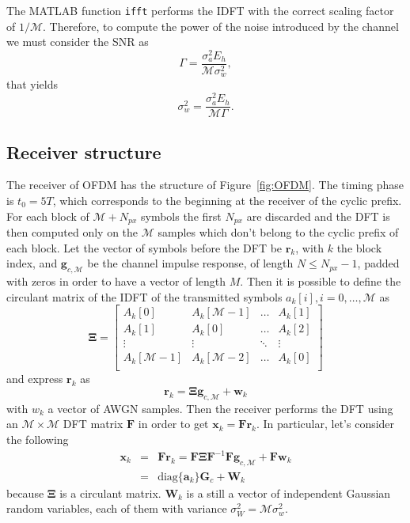 \documentclass[10pt]{article}
\newcommand{\ofdM} {\mathcal{M}}
\newcommand{\DFTmat} {\mathcal{\mathbf{F}}}
\begin{document}
The MATLAB function \texttt{ifft} performs the IDFT with the correct scaling factor of $1/\ofdM$. Therefore, to compute the power of the noise introduced by the channel we must consider the SNR as
\begin{equation}
	\Gamma = \dfrac{\sigma_a^2 E_h}{\ofdM \sigma_w^2},
\end{equation}
that yields
\begin{equation}
	\sigma_w^2 = \dfrac{\sigma_a^2 E_h}{\ofdM \Gamma}.
\end{equation}

\subsection*{Receiver structure}
The receiver of OFDM has the structure of Figure~\ref{fig:OFDM}. The timing phase is $t_0 = 5 T$, which corresponds to the beginning at the receiver of the cyclic prefix. For each block of $\ofdM + N_{px}$ symbols the first $N_{px}$ are discarded and the DFT is then computed only on the $\ofdM$ samples which don't belong to the cyclic prefix of each block. Let the vector of symbols before the DFT be $\mathbf{r}_k$, with $k$ the block index, and $\mathbf{g}_{c,\ofdM}$ be the channel impulse response, of length $N \le N_{px} - 1$, padded with zeros in order to have a vector of length $M$. Then it is possible to define the circulant matrix of the IDFT of the transmitted symbols $a_k[i], i = 0, \dots, \ofdM$ as
\begin{equation}
	\boldsymbol{\Xi} = 
	\begin{bmatrix}
		A_k[0] & A_k[\ofdM - 1] & \dots & A_k[1] \\
		A_k[1] & A_k[0] & \dots & A_k[2] \\
		\vdots & \vdots & \ddots & \vdots \\
		A_k[\ofdM - 1] & A_k[\ofdM - 2] & \dots & A_k[0] \\
	\end{bmatrix}
\end{equation}
and express $\mathbf{r}_k$ as
\begin{equation}
	\mathbf{r}_k = \boldsymbol{\Xi} \mathbf{g}_{c,\ofdM} + \mathbf{w}_k
\end{equation}
with $w_k$ a vector of AWGN samples. Then the receiver performs the DFT using an $\ofdM \times \ofdM$ DFT matrix $\DFTmat$ in order to get $ \mathbf{x}_k = \DFTmat \mathbf{r}_k$. In particular, let's consider the following 
\begin{eqnarray}
	 \mathbf{x}_k & = & \DFTmat \mathbf{r}_k = \DFTmat \boldsymbol{\Xi} \DFTmat^{-1} \DFTmat \mathbf{g}_{c,\ofdM} + \DFTmat \mathbf{w}_k\\
	  & = & \mathrm{diag}\{\mathbf{a}_k\} \mathbf{G}_c + \mathbf{W}_k
\end{eqnarray}
because $\boldsymbol{\Xi}$ is a circulant matrix. $\mathbf{W}_k$ is a still a vector of independent Gaussian random variables, each of them with variance $\sigma_W^2 = \ofdM \sigma_w^2$. 
\end{document}

